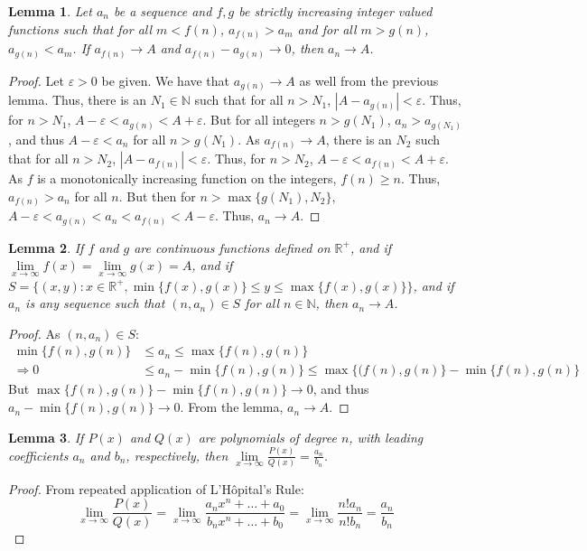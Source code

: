 \documentclass[oneside]{book}
\theoremstyle{mystyle}
\newtheorem{lemma}{Lemma}[section]
\begin{document}
\begin{lemma}
Let $a_n$ be a sequence and $f,g$ be strictly increasing integer valued functions such that for all $m<f(n)$, $a_{f(n)}>a_m$ and for all $m>g(n)$, $a_{g(n)}<a_m$. If $a_{f(n)}\rightarrow A$ and $a_{f(n)}-a_{g(n)}\rightarrow 0$, then $a_n \rightarrow A$.
\end{lemma}
\begin{proof}
Let $\varepsilon>0$ be given. We have that $a_{g(n)}\rightarrow A$ as well from the previous lemma. Thus, there is an $N_1 \in \mathbb{N}$ such that for all $n>N_1$, $|A-a_{g(n)}|<\varepsilon$. Thus, for $n>N_1$, $A-\varepsilon < a_{g(n)}<A+\varepsilon$. But for all integers $n>g(N_1)$, $a_n >a_{g(N_1)}$, and thus $A-\varepsilon < a_n$ for all $n>g(N_1)$. As $a_{f(n)}\rightarrow A$, there is an $N_2$ such that for all $n>N_2$, $|A-a_{f(n)}|<\varepsilon$. Thus, for $n>N_2$, $A-\varepsilon < a_{f(n)}<A+\varepsilon$. As $f$ is a monotonically increasing function on the integers, $f(n)\geq n$. Thus, $a_{f(n)}>a_n$ for all $n$. But then for $n>\max\{g(N_1),N_2\}$, $A-\varepsilon < a_{g(n)} < a_n < a_{f(n)}<A-\varepsilon$. Thus, $a_n \rightarrow A$.
\end{proof}
%
\begin{lemma}
If $f$ and $g$ are continuous functions defined on $\mathbb{R}^+$, and if $\underset{x\rightarrow \infty}\lim f(x) = \underset{x\rightarrow \infty}\lim g(x)=A$, and if $S = \{(x,y):x\in \mathbb{R}^+,\min\{f(x),g(x)\}\leq y \leq \max\{f(x),g(x)\}\}$, and if $a_n$ is any sequence such that $(n,a_n)\in S$ for all $n\in \mathbb{N}$, then $a_n \rightarrow A$.
\end{lemma}
\begin{proof}
As $(n,a_n)\in S$:
%
\begin{align*}
    \min\{f(n),g(n)\} &\leq a_n \leq \max\{f(n),g(n)\}\\
    \Rightarrow 0 &\leq a_n - \min\{f(n),g(n)\} \leq \max\{(f(n),g(n)\}-\min\{f(n),g(n)\}    
\end{align*}
%
But $\max\{f(n),g(n)\}-\min\{f(n),g(n)\} \rightarrow 0$, and thus $a_n - \min\{f(n),g(n)\} \rightarrow 0$. From the lemma, $a_n \rightarrow A$.
\end{proof}
%
\begin{lemma}
If $P(x)$ and $Q(x)$ are polynomials of degree $n$, with leading coefficients $a_n$ and $b_n$, respectively, then $\underset{x\rightarrow \infty}\lim \frac{P(x)}{Q(x)} = \frac{a_n}{b_n}$.
\end{lemma}
\begin{proof}
From repeated application of L'H\^{o}pital's Rule:
%
\begin{equation*}
    \underset{x\rightarrow \infty}\lim \frac{P(x)}{Q(x)} = \underset{x\rightarrow \infty}\lim \frac{a_n x^n + \hdots + a_0}{b_n x^n + \hdots + b_0} = \underset{x\rightarrow \infty} \lim\frac{n! a_n}{n! b_n} = \frac{a_n}{b_n}
\end{equation*}
\end{proof}
\end{document}
